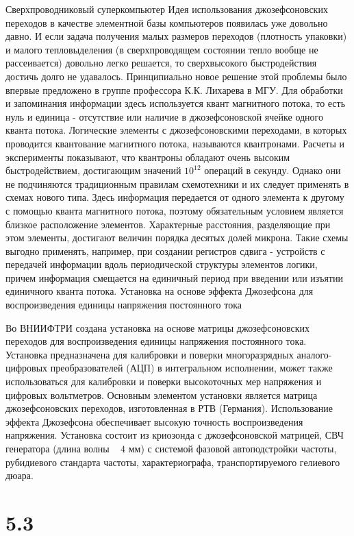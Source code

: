 \documentclass[a4paper,14pt]{article}
\begin{document}
Сверхпроводниковый суперкомпьютер
Идея использования джозефсоновских переходов в качестве элементной базы компьютеров появилась уже довольно давно. И если задача получения малых размеров переходов (плотность упаковки) и малого тепловыделения (в сверхпроводящем состоянии тепло вообще не рассеивается) довольно легко решается, то сверхвысокого быстродействия достичь долго не удавалось. 
Принципиально новое решение этой проблемы было впервые предложено в группе профессора К.К. Лихарева в МГУ. Для обработки и запоминания информации здесь используется квант магнитного потока, то есть нуль и единица - отсутствие или наличие в джозефсоновской ячейке одного кванта потока. Логические элементы с джозефсоновскими переходами, в которых проводится квантование магнитного потока, называются квантронами. Расчеты и эксперименты показывают, что квантроны обладают очень высоким быстродействием, достигающим значений $10^{12}$ операций в секунду. Однако они не подчиняются традиционным правилам схемотехники и их следует применять в схемах нового типа. Здесь информация передается от одного элемента к другому с помощью кванта магнитного потока, поэтому обязательным условием является близкое расположение элементов. Характерные расстояния, разделяющие при этом элементы, достигают величин порядка десятых долей микрона. Такие схемы выгодно применять, например, при создании регистров сдвига - устройств с передачей информации вдоль периодической структуры элементов логики, причем информация смещается на единичный период при введении или изъятии единичного кванта потока.
Установка на основе эффекта Джозефсона для воспроизведения единицы напряжения постоянного тока

Во ВНИИФТРИ создана установка на основе матрицы джозефсоновских переходов для воспроизведения единицы напряжения постоянного тока. 
Установка предназначена для калибровки и поверки многоразрядных аналого-цифровых преобразователей (АЦП) в интегральном исполнении, может также использоваться для калибровки и поверки высокоточных мер напряжения и цифровых вольтметров. 
Основным элементом установки является матрица джозефсоновских переходов, изготовленная в РТВ (Германия). Использование эффекта Джозефсона обеспечивает высокую точность воспроизведения напряжения. 
Установка состоит из криозонда с джозефсоновской матрицей, СВЧ генератора (длина волны ~ $4$ мм) с системой фазовой автоподстройки частоты, рубидиевого стандарта частоты, характериографа, транспортируемого гелиевого дюара. 

\section*{5.3}
\end{document}
